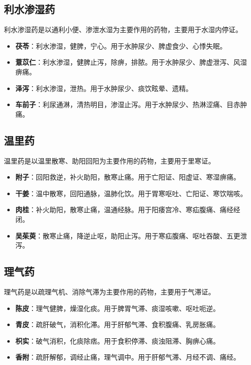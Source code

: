 \documentclass[12pt,UTF8]{ctexbook}
\begin{document}
\subsection{利水渗湿药}

利水渗湿药是以通利小便、渗泄水湿为主要作用的药物，主要用于水湿内停证。

\begin{itemize}
\item \textbf{茯苓}：利水渗湿，健脾，宁心。用于水肿尿少、脾虚食少、心悸失眠。
\item \textbf{薏苡仁}：利水渗湿，健脾止泻，除痹，排脓。用于水肿尿少、脾虚泄泻、风湿痹痛。
\item \textbf{泽泻}：利水渗湿，泄热。用于水肿尿少、痰饮眩晕、遗精。
\item \textbf{车前子}：利尿通淋，清热明目，渗湿止泻。用于水肿尿少、热淋涩痛、目赤肿痛。
\end{itemize}

\subsection{温里药}

温里药是以温里散寒、助阳回阳为主要作用的药物，主要用于里寒证。

\begin{itemize}
\item \textbf{附子}：回阳救逆，补火助阳，散寒止痛。用于亡阳证、阳虚证、寒湿痹痛。
\item \textbf{干姜}：温中散寒，回阳通脉，温肺化饮。用于胃寒呕吐、亡阳证、寒饮喘咳。
\item \textbf{肉桂}：补火助阳，散寒止痛，温通经脉。用于阳痿宫冷、寒疝腹痛、痛经经闭。
\item \textbf{吴茱萸}：散寒止痛，降逆止呕，助阳止泻。用于寒疝腹痛、呕吐吞酸、五更泄泻。
\end{itemize}

\subsection{理气药}

理气药是以疏理气机、消除气滞为主要作用的药物，主要用于气滞证。

\begin{itemize}
\item \textbf{陈皮}：理气健脾，燥湿化痰。用于脾胃气滞、痰湿咳嗽、呕吐呃逆。
\item \textbf{青皮}：疏肝破气，消积化滞。用于肝郁气滞、食积腹痛、乳房胀痛。
\item \textbf{枳实}：破气消积，化痰除痞。用于食积停滞、痰浊阻滞、胸痹心痛。
\item \textbf{香附}：疏肝解郁，调经止痛，理气调中。用于肝郁气滞、月经不调、痛经。
\end{itemize}
\end{document}

